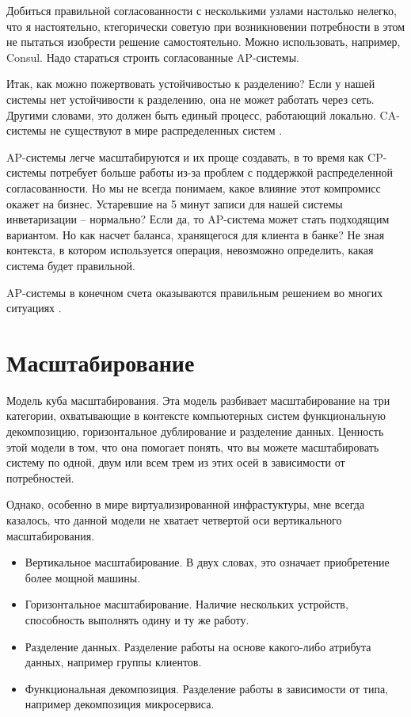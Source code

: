 \documentclass[%
	11pt,
	a4paper,
	utf8,
		]{article}
\begin{document}
Добиться правильной согласованности с несколькими узлами настолько нелегко, что я настоятельно, ктегорически советую при возникновении потребности в этом не пытаться изобрести решение самостоятельно. Можно использовать, например, Consul. Надо стараться строить согласованные AP-системы.

Итак, как можно пожертвовать устойчивостью к разделению? Если у нашей системы нет устойчивости к разделению, она не может работать через сеть. Другими словами, это должен быть единый процесс, работающий локально. {\color{red}CA-системы не существуют в мире распределенных систем} \cite[]{microservices-2024}.

AP-системы легче масштабируются и их проще создавать, в то время как CP-системы потребует больше работы из-за проблем с поддержкой распределенной согласованности. Но мы не всегда понимаем, какое влияние этот компромисс окажет на бизнес. Устаревшие на 5 минут записи для нашей системы инветаризации -- нормально? Если да, то AP-система может стать подходящим вариантом. Но как насчет баланса, хранящегося для клиента в банке? Не зная контекста, в котором используется операция, невозможно определить, какая система будет правильной.

AP-системы в конечном счета оказываются правильным решением во многих ситуациях \cite[]{microservices-2024}.

\section{Масштабирование}

Модель куба масштабирования. Эта модель разбивает масштабирование на три категории, охватывающие в контексте компьютерных систем функциональную декомпозицию, горизонтальное дублирование и разделение данных. Ценность этой модели в том, что она помогает понять, что вы можете масштабировать систему по одной, двум или всем трем из этих осей в зависимости от потребностей.

Однако, особенно в мире виртуализированной инфрастуктуры, мне всегда казалось, что данной модели не хватает четвертой оси вертикального масштабирования. 
\begin{itemize}
	\item Вертикальное масштабирование. В двух словах, это означает приобретение более мощной машины.
	
	\item Горизонтальное масштабирование. Наличие нескольких устройств, способность выполнять одину и ту же работу.
	
	\item Разделение данных. Разделение работы на основе какого-либо атрибута данных, например группы клиентов.
	
	\item Функциональная декомпозиция. Разделение работы в зависимости от типа, например декомпозиция микросервиса.
\end{itemize}
\end{document}
